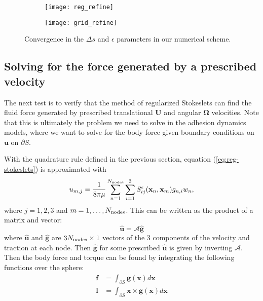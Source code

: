 \documentclass{article}
\newcommand{\tn}{\textnormal}
\begin{document}
\begin{figure}
  \centering
  \begin{subfigure}{0.48\textwidth}
    \texttt{[image: reg\_refine]}
  \end{subfigure}
  \hfill
  \begin{subfigure}{0.48\textwidth}
    \texttt{[image: grid\_refine]}
  \end{subfigure}
  \caption{Convergence in the $\Delta s$ and $\epsilon$ parameters in
    our numerical scheme.}
  \label{fig:our-conv}
\end{figure}

\subsection{Solving for the force generated by a prescribed velocity}
\label{sec:solv-force-gener}

The next test is to verify that the method of regularized Stokeslets
can find the fluid force generated by prescribed translational
$\mathbf{U}$ and angular $\mathbf{\Omega}$ velocities. Note that this
is ultimately the problem we need to solve in the adhesion dynamics
models, where we want to solve for the body force given boundary
conditions on $\mathbf{u}$ on $\partial S$.

With the quadrature rule defined in the previous section, equation
(\ref{eq:reg-stokeslets}) is approximated with
\begin{equation}
  \label{eq:approx-stokeslets}
  u_{m, j} = \frac{1}{8\pi \mu} \sum_{n=1}^{N_\tn{nodes}} \sum_{i=1}^3
  S_{ij}^\epsilon(\mathbf{x}_n, \mathbf{x}_m) g_{n,i} w_n,
\end{equation}
where $j = 1, 2, 3$ and $m = 1, \hdots, N_\tn{nodes}$. This can be
written as the product of a matrix and vector:
\begin{equation}
  \label{eq:quadrature-matrix}
  \hat{\mathbf{u}} = \mathcal{A} \hat{\mathbf{g}}
\end{equation}
where $\hat{\mathbf{u}}$ and $\hat{\mathbf{g}}$ are
$3N_\tn{nodes} \times 1$ vectors of the 3 components of the velocity
and traction at each node. Then $\hat{\mathbf{g}}$ for some prescribed
$\hat{\mathbf{u}}$ is given by inverting $\mathcal{A}$. Then the body
force and torque can be found by integrating the following functions
over the sphere:
\begin{align}
  \mathbf{f} &= \int_{\partial S} \mathbf{g}(\mathbf{x}) d\mathbf{x}
  \\
  \mathbf{l} &= \int_{\partial S} \mathbf{x} \times
               \mathbf{g}(\mathbf{x}) d\mathbf{x}
\end{align}
\end{document}
